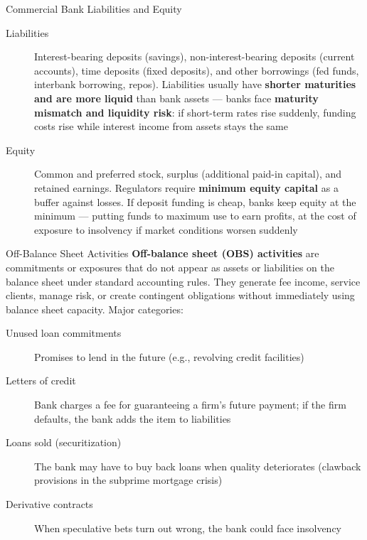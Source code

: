 \documentclass[aspectratio=169]{beamer}
\begin{document}
\begin{frame}{Commercial Bank Liabilities and Equity}
\begin{description}
  \item[Liabilities] Interest-bearing deposits (savings), non-interest-bearing deposits (current accounts), time deposits (fixed deposits), and other borrowings (fed funds, interbank borrowing, repos). Liabilities usually have \textbf{shorter maturities and are more liquid} than bank assets --- banks face \textbf{maturity mismatch and liquidity risk}: if short-term rates rise suddenly, funding costs rise while interest income from assets stays the same
  \item[Equity] Common and preferred stock, surplus (additional paid-in capital), and retained earnings. Regulators require \textbf{minimum equity capital} as a buffer against losses. If deposit funding is cheap, banks keep equity at the minimum --- putting funds to maximum use to earn profits, at the cost of exposure to insolvency if market conditions worsen suddenly
\end{description}
\end{frame}

\begin{frame}{Off-Balance Sheet Activities}
\textbf{Off-balance sheet (OBS) activities} are commitments or exposures that do not appear as assets or liabilities on the balance sheet under standard accounting rules. They generate fee income, service clients, manage risk, or create contingent obligations without immediately using balance sheet capacity. Major categories:
\begin{description}
  \item[Unused loan commitments] Promises to lend in the future (e.g., revolving credit facilities)
  \item[Letters of credit] Bank charges a fee for guaranteeing a firm's future payment; if the firm defaults, the bank adds the item to liabilities
  \item[Loans sold (securitization)] The bank may have to buy back loans when quality deteriorates (clawback provisions in the subprime mortgage crisis)
  \item[Derivative contracts] When speculative bets turn out wrong, the bank could face insolvency
\end{description}
\end{frame}
\end{document}
